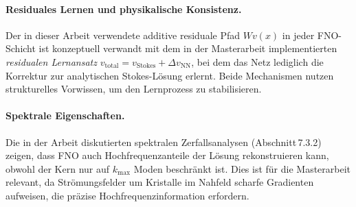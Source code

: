 \documentclass[a4paper,12pt]{article}
\begin{document}
\paragraph{Residuales Lernen und physikalische Konsistenz.}
Der in dieser Arbeit verwendete additive residuale Pfad $Wv(x)$ in jeder FNO-Schicht
ist konzeptuell verwandt mit dem in der Masterarbeit implementierten
\emph{residualen Lernansatz} $v_\text{total} = v_\text{Stokes} + \Delta v_\text{NN}$,
bei dem das Netz lediglich die Korrektur zur analytischen Stokes-Lösung erlernt.
Beide Mechanismen nutzen strukturelles Vorwissen, um den Lernprozess zu stabilisieren.

\paragraph{Spektrale Eigenschaften.}
Die in der Arbeit diskutierten spektralen Zerfallsanalysen (Abschnitt\,7.3.2)
zeigen, dass FNO auch Hochfrequenzanteile der Lösung rekonstruieren kann,
obwohl der Kern nur auf $k_\text{max}$ Moden beschränkt ist. Dies ist für die
Masterarbeit relevant, da Strömungsfelder um Kristalle im Nahfeld scharfe
Gradienten aufweisen, die präzise Hochfrequenzinformation erfordern.
\end{document}
